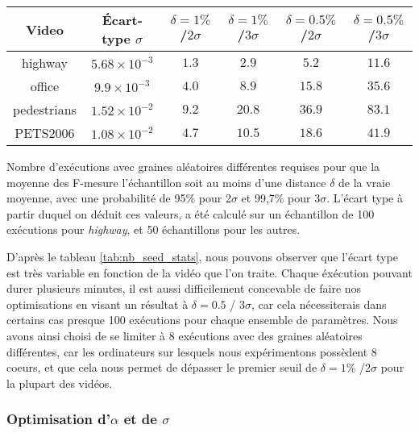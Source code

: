 	\begin{tableth}
	\begin{tabular}{|c|c|cccc|}
		\hline
		Video	& Écart-type $\sigma$& $\delta=1\%$ /$2\sigma$ & $\delta=1\%$ /$3\sigma$ & $\delta=0.5\%$ /$2\sigma$ & $\delta=0.5\%$ /$3\sigma$\\
		\hline
		highway & $5.68 \times 10^{-3}$ & $1.3$ & $2.9$ & $5.2$ & $11.6$\\
		office & $9.9 \times 10^{-3}$ & $4.0$ & $8.9$ & $15.8$ & $35.6$\\
		pedestrians & $1.52 \times 10^{-2}$ & $9.2$ & $20.8$ & $36.9$ & $83.1$\\
		PETS2006 & $1.08 \times 10^{-2}$ & $4.7$ & $10.5$ & $18.6$ & $41.9$\\
		\hline
	\end{tabular}
	\caption[Estimations statistiques du nombre de graines requises]{Nombre d'exécutions avec graines aléatoires différentes requises pour que la moyenne des F-mesure l'échantillon soit au moins d'une distance $\delta$ de la vraie moyenne, avec une probabilité de 95\% pour 2$\sigma$ et 99,7\% pour 3$\sigma$. L'écart type à partir duquel on déduit ces valeurs, a été calculé sur un échantillon de 100 exécutions pour \textit{highway}, et 50 échantillons pour les autres.} \label{tab:nb_seed_stats}
	\end{tableth}

	D'après le tableau \ref{tab:nb_seed_stats}, nous pouvons observer que l'écart type est très variable en fonction de la vidéo que l'on traite. Chaque éxécution pouvant durer plusieurs minutes, il est aussi difficilement concevable de faire nos optimisations en visant un résultat à $\delta = 0.5$ / $3\sigma$, car cela nécessiterais dans certains cas presque 100 exécutions pour chaque ensemble de paramètres. Nous avons ainsi choisi de se limiter à 8 exécutions avec des graines aléatoires différentes, car les ordinateurs sur lesquels nous expérimentons possèdent 8 coeurs, et que cela nous permet de dépasser le premier seuil de $\delta=1\%$ /$2\sigma$ pour la plupart des vidéos.

	\subsubsection{Optimisation d'$\alpha$ et de $\sigma$}

